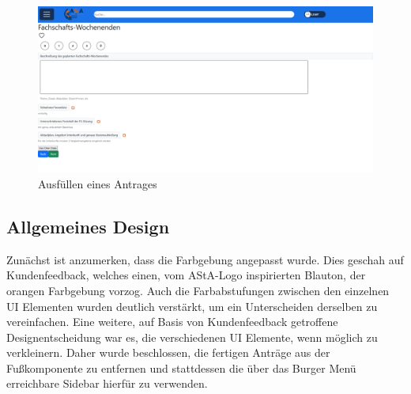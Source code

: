 \begin{figure}[h]
\centering
\includegraphics[width=1.0\textwidth]{Doc/images/Fill in Antrag.png}
\caption{Ausfüllen eines Antrages}\label{Ausfüllen eines Antrages}
\end{figure}

\subsection{Allgemeines Design}\label{Allgemeines Design}
Zunächst ist anzumerken, dass die Farbgebung angepasst wurde. Dies geschah auf
Kundenfeedback, welches einen, vom AStA-Logo inspirierten Blauton, der orangen
Farbgebung vorzog. Auch die Farbabstufungen zwischen den einzelnen \ac{UI} Elementen
wurden deutlich verstärkt, um ein Unterscheiden derselben zu vereinfachen.
Eine weitere, auf Basis von Kundenfeedback getroffene Designentscheidung war es, die
verschiedenen \ac{UI} Elemente, wenn möglich zu verkleinern. Daher wurde beschlossen, die
fertigen Anträge aus der Fußkomponente zu entfernen und stattdessen die über das Burger
Menü erreichbare Sidebar hierfür zu verwenden.

